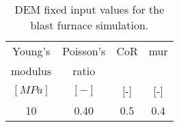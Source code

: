 \begin{table}[h]
\centering
\begin{tabular}{cccc}
\hline
    Young's & Poisson's & \acs{CoR} & \acs{mur}\\
   modulus & ratio & & \\
    $[MPa]$ & $[-]$ & [-] & [-] \\
    \hline
    10    & 0.40 & 0.5 & 0.4 \\


\hline
\end{tabular}
\caption{DEM fixed input values for the blast furnace simulation.}
\label{tab:36BFDEMvalues}
\end{table}